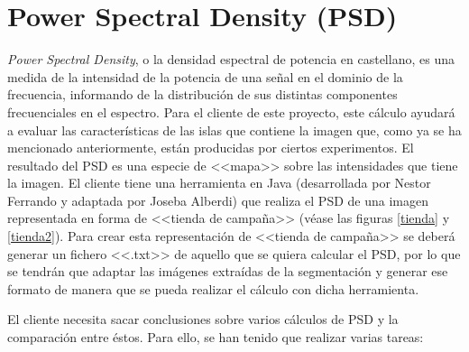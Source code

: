 \section{Power Spectral Density (PSD)}

\textit{Power Spectral Density}, o la densidad espectral de potencia en castellano, es una medida de la intensidad de la potencia de una se\~{n}al en el dominio de la frecuencia, informando de la distribuci\'{o}n de sus distintas componentes frecuenciales en el espectro. Para el cliente de este proyecto, este c\'{a}lculo ayudar\'{a} a evaluar las caracter\'{i}sticas de las islas que contiene la imagen que, como ya se ha mencionado anteriormente, est\'{a}n producidas por ciertos experimentos. El resultado del PSD es una especie de <<mapa>> sobre las intensidades que tiene la imagen. El cliente tiene una herramienta en Java (desarrollada por Nestor Ferrando y adaptada por Joseba Alberdi) que realiza el PSD de una imagen representada en forma de <<tienda de campa\~{n}a>> (v\'{e}ase las figuras \ref{tienda} y \ref{tienda2}). Para crear esta representaci\'{o}n de <<tienda de campa\~{n}a>> se deber\'{a} generar un fichero <<.txt>> de aquello que se quiera calcular el PSD, por lo que se tendr\'{a}n que adaptar las im\'{a}genes extra\'{i}das de la segmentaci\'{o}n y generar ese formato de manera que se pueda realizar el c\'{a}lculo con dicha herramienta.

El cliente necesita sacar conclusiones sobre varios c\'{a}lculos de PSD y la comparaci\'{o}n entre \'{e}stos. Para ello, se han tenido que realizar varias tareas:

